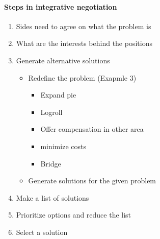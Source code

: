 \paragraph{Steps in integrative negotiation}

\begin{enumerate}
    \item Sides need to agree on what the problem is
    \item What are the interests behind the positions
    \item Generate alternative solutions
        \begin{itemize}
            \item Redefine the problem (Exapmle 3)
                \begin{itemize}
                    \item Expand pie
                    \item Logroll
                    \item Offer compensation in other area
                    \item minimize costs
                    \item Bridge
                \end{itemize}
            \item Generate solutions for the given problem
        \end{itemize}
    \item Make a list of solutions
    \item Prioritize options and reduce the list
    \item Select a solution
\end{enumerate}

